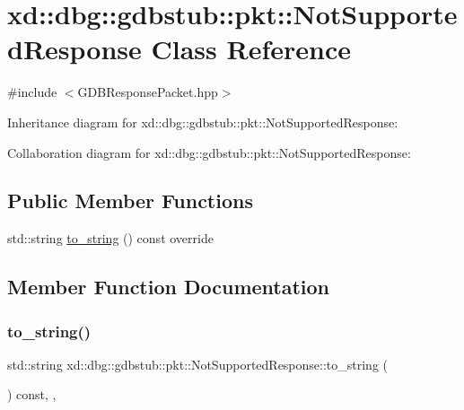 \hypertarget{classxd_1_1dbg_1_1gdbstub_1_1pkt_1_1_not_supported_response}{}\section{xd\+:\+:dbg\+:\+:gdbstub\+:\+:pkt\+:\+:Not\+Supported\+Response Class Reference}
\label{classxd_1_1dbg_1_1gdbstub_1_1pkt_1_1_not_supported_response}


{\ttfamily \#include $<$G\+D\+B\+Response\+Packet.\+hpp$>$}



Inheritance diagram for xd\+:\+:dbg\+:\+:gdbstub\+:\+:pkt\+:\+:Not\+Supported\+Response\+:


Collaboration diagram for xd\+:\+:dbg\+:\+:gdbstub\+:\+:pkt\+:\+:Not\+Supported\+Response\+:
\subsection*{Public Member Functions}
\begin{DoxyCompactItemize}
\item 
std\+::string \mbox{\hyperlink{classxd_1_1dbg_1_1gdbstub_1_1pkt_1_1_not_supported_response_a4ca25c28620c5d82304d94608c3cbbb0}{to\+\_\+string}} () const override
\end{DoxyCompactItemize}


\subsection{Member Function Documentation}
\mbox{\label{classxd_1_1dbg_1_1gdbstub_1_1pkt_1_1_not_supported_response_a4ca25c28620c5d82304d94608c3cbbb0}} 
\subsubsection{\texorpdfstring{to\+\_\+string()}{to\_string()}}
{\footnotesize\ttfamily std\+::string xd\+::dbg\+::gdbstub\+::pkt\+::\+Not\+Supported\+Response\+::to\+\_\+string (\begin{DoxyParamCaption}{ }\end{DoxyParamCaption}) const\hspace{0.3cm}{\ttfamily [inline]}, {\ttfamily [override]}, {\ttfamily [virtual]}}



